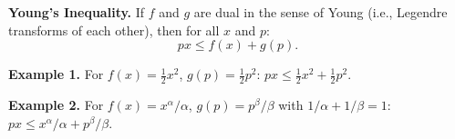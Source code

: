 \textbf{Young's Inequality.} If $f$ and $g$ are dual in the sense of Young (i.e., Legendre transforms of each other), then for all $x$ and $p$:
$$px \leq f(x) + g(p).$$

\textbf{Example 1.} For $f(x) = \frac{1}{2}x^2$, $g(p) = \frac{1}{2}p^2$: $px \leq \frac{1}{2}x^2 + \frac{1}{2}p^2$.

\textbf{Example 2.} For $f(x) = x^\alpha/\alpha$, $g(p) = p^\beta/\beta$ with $1/\alpha + 1/\beta = 1$: $px \leq x^\alpha/\alpha + p^\beta/\beta$.
